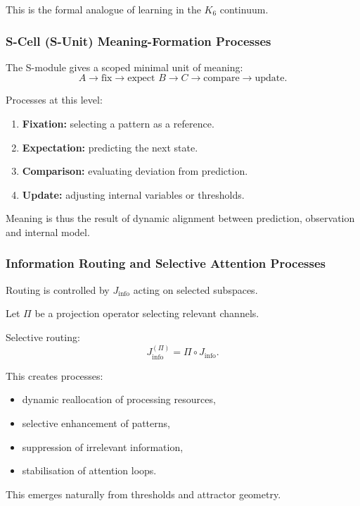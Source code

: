 This is the formal analogue of learning in the $K_6$ continuum.

\subsubsection{S-Cell (S-Unit) Meaning-Formation Processes}

The S-module gives a scoped minimal unit of meaning:
\[
A \to \text{fix} \to \text{expect } B \to C \to \text{compare} \to
\text{update}.
\]

Processes at this level:
\begin{enumerate}
    \item \textbf{Fixation:}
    selecting a pattern as a reference.
    \item \textbf{Expectation:}
    predicting the next state.
    \item \textbf{Comparison:}
    evaluating deviation from prediction.
    \item \textbf{Update:}
    adjusting internal variables or thresholds.
\end{enumerate}

Meaning is thus the result of dynamic alignment between prediction,
observation and internal model.

\subsubsection{Information Routing and Selective Attention Processes}

Routing is controlled by $J_{\text{info}}$ acting on selected subspaces.

Let $\Pi$ be a projection operator selecting relevant channels.

Selective routing:
\[
J_{\text{info}}^{(\Pi)} = \Pi \circ J_{\text{info}}.
\]

This creates processes:
\begin{itemize}
    \item dynamic reallocation of processing resources,
    \item selective enhancement of patterns,
    \item suppression of irrelevant information,
    \item stabilisation of attention loops.
\end{itemize}

This emerges naturally from thresholds and attractor geometry.

